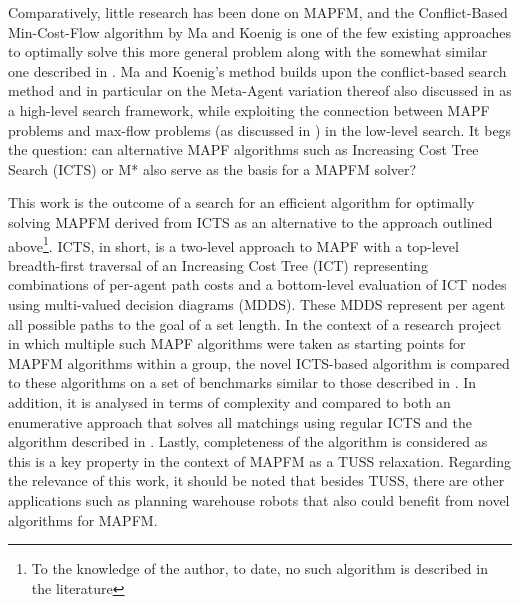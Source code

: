 \documentclass[english]{article}
\begin{document}
	Comparatively, little research has been done on MAPFM, and the Conflict-Based Min-Cost-Flow algorithm by Ma and Koenig \cite{ma2016} is one of the few existing approaches to optimally solve this more general problem along with the somewhat similar one described in \cite{henkel2019}. Ma and Koenig's method builds upon the conflict-based search method and in particular on the Meta-Agent variation thereof also discussed in \cite{sharon2015} as a high-level search framework, while exploiting the connection between MAPF problems and max-flow problems (as discussed in \cite{yu2013}) in the low-level search. It begs the question: can alternative MAPF algorithms such as Increasing Cost Tree Search (ICTS) \cite{sharon2011} or M* \cite{wagner2011} also serve as the basis for a MAPFM solver?
	
	This work is the outcome of a search for an efficient algorithm for optimally solving MAPFM derived from ICTS as an alternative to the approach outlined above\footnote{To the knowledge of the author, to date, no such algorithm is described in the literature}. ICTS, in short, is a two-level approach to MAPF with a top-level breadth-first traversal of an Increasing Cost Tree (ICT) representing combinations of per-agent path costs and a bottom-level evaluation of ICT nodes using multi-valued decision diagrams (MDDS). These MDDS represent per agent all possible paths to the goal of a set length. In the context of a research project in which multiple such MAPF algorithms were taken as starting points for MAPFM algorithms within a group, the novel ICTS-based algorithm is compared to these algorithms on a set of benchmarks similar to those described in \cite{stern2019}. In addition, it is analysed in terms of complexity and compared to both an enumerative approach that solves all matchings using regular ICTS and the algorithm described in \cite{ma2016}. Lastly, completeness of the algorithm is considered as this is a key property in the context of MAPFM as a TUSS relaxation. Regarding the relevance of this work, it should be noted that besides TUSS, there are other applications such as planning warehouse robots \cite{wurman2007} that also could benefit from novel algorithms for MAPFM.
	
\end{document}

